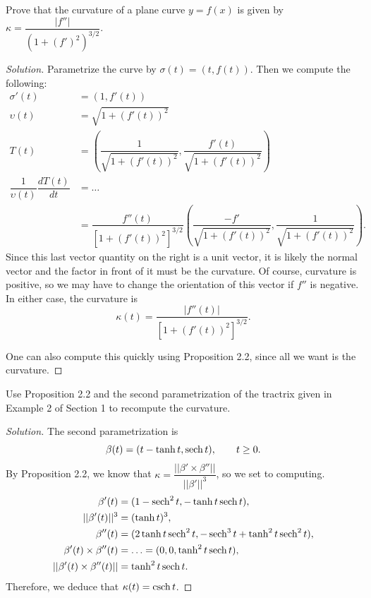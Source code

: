 \documentclass[Shifrin_Solutions_Spring_2018]{subfiles}
\begin{document}
\clearpage


\begin{exercise}
Prove that the curvature of a plane curve $y=f(x)$ is given by 
$\displaystyle \kappa = \dfrac{|f''|}{(1+(f')^2)^{3/2}}$.
\end{exercise}

\begin{proof}[Solution]
Parametrize the curve by $\sigma(t) = ( t, f(t) )$. Then we compute the following:
\begin{align*}
\sigma'(t) & = (1, f'(t) ) \\
\upsilon(t) & = \sqrt{1 + (f'(t))^2} \\
T(t) & = \left( \dfrac{1}{\sqrt{1 + (f'(t))^2} } , 
\dfrac{f'(t)}{\sqrt{1 + (f'(t))^2}} \right) \\
\dfrac{1}{\upsilon(t)} \dfrac{dT(t)}{dt} & = \ldots \\
& = \dfrac{f''(t)}{[1 + (f'(t))^2]^{3/2}} \left( \dfrac{- f'}{\sqrt{1 + (f'(t))^2}} , 
\dfrac{1}{\sqrt{1 + (f'(t))^2}} \right) .
\end{align*}
Since this last vector quantity on the right is a unit vector, it is likely 
the normal vector and the factor in front of it must be the curvature. Of course, 
curvature is positive, so we may have to change the orientation of this vector if 
$f''$ is negative. In either case, the curvature is
\[
\kappa(t) = \dfrac{|f''(t)|}{[1 + (f'(t))^2]^{3/2}}  .
\]

One can also compute this quickly using Proposition 2.2, since all we want is 
the curvature.
\end{proof}


\vspace{.5cm}


\begin{exercise}
Use Proposition 2.2 and the second parametrization of the tractrix given in 
Example 2 of Section 1 to recompute the curvature.
\end{exercise}

\begin{proof}[Solution]
The second parametrization is
\[
\beta(t) = (t-\tanh t , \operatorname{\mathrm{sech}} t ), \qquad t\geq 0.
\]
By Proposition 2.2, we know that 
$\kappa = \dfrac{||\beta' \times \beta''||}{||\beta'||^3}$, so we set to computing.
\begin{align*}
\beta'(t) & = ( 1 - \operatorname{\mathrm{sech}}^2 t , -\tanh t \operatorname{\mathrm{sech}} t ) , \\
||\beta'(t) ||^3 & = (\tanh t)^3 , \\
\beta''(t) & = ( 2\tanh t \operatorname{\mathrm{sech}}^2 t , -\operatorname{\mathrm{sech}}^3 t + \tanh^2 t \operatorname{\mathrm{sech}}^2 t ) , \\
\beta'(t) \times \beta''(t) &= \ldots = (0,0, \tanh^2 t \operatorname{\mathrm{sech}} t ) , \\
||\beta'(t) \times \beta''(t)|| & = \tanh^2 t \operatorname{\mathrm{sech}} t .
\end{align*}
Therefore, we deduce that $\kappa(t) = \operatorname{\mathrm{csch}} t$.
\end{proof}
\end{document}
